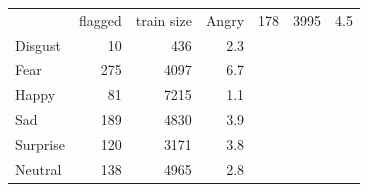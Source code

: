 \begin{tabular}{lrrr}
\toprule
 & flagged & train size & %
\midrule
Angry & 178 & 3995 & 4.5 \\
Disgust & 10 & 436 & 2.3 \\
Fear & 275 & 4097 & 6.7 \\
Happy & 81 & 7215 & 1.1 \\
Sad & 189 & 4830 & 3.9 \\
Surprise & 120 & 3171 & 3.8 \\
Neutral & 138 & 4965 & 2.8 \\
\bottomrule
\end{tabular}
